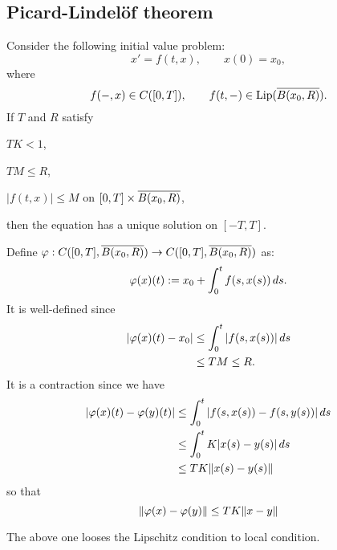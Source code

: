 \documentclass[11pt]{article}
\begin{document}
\subsection{Picard-Lindel\"of theorem}
\begin{thm}
Consider the following initial value problem:
\[x'=f(t,x),\qquad x(0)=x_0,\]
where
\[f(-,x)\in C([0,T]),\qquad f(t,-)\in\operatorname{Lip}(\overline{B(x_0,R)}).\]
If $T$ and $R$ satisfy
\begin{cond}
\item $TK<1$,
\item $TM\le R$,
\item $|f(t,x)|\le M$ on $[0,T]\times\overline{B(x_0,R)}$,
\end{cond}
then the equation has a unique solution on $[-T,T]$.
\end{thm}
\begin{pf}
Define $\f:C([0,T],\cl{B(x_0,R)})\to C([0,T],\cl{B(x_0,R)})$ as:
\[\varphi(x)(t):=x_0+\int_0^tf(s,x(s))\,ds.\]
It is well-defined since
\begin{align*}
|\varphi(x)(t)-x_0|&\le\int_0^t|f(s,x(s))|\,ds\\
&\le TM\le R.
\end{align*}
It is a contraction since we have
\begin{align*}
|\varphi(x)(t)-\varphi(y)(t)|
&\le\int_0^t|f(s,x(s))-f(s,y(s))|\,ds\\
&\le\int_0^tK|x(s)-y(s)|\,ds\\
&\le TK\|x(s)-y(s)\|
\end{align*}
so that
\[\|\varphi(x)-\varphi(y)\|\le TK\|x-y\|\]
\end{pf}
The above one looses the Lipschitz condition to local condition.
\end{document}
